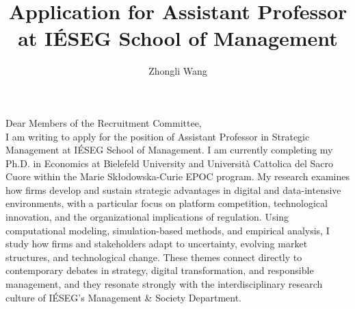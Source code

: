 \documentclass{nfr}
\title{Application for Assistant Professor at IÉSEG School of Management}
\author{Zhongli Wang}
\begin{document}

% 
% 
% 
% 


\maketitle


\noindent Dear Members of the Recruitment Committee,\\[0.2cm]

I am writing to apply for the position of Assistant Professor in Strategic Management at IÉSEG School of Management. 
I am currently completing my Ph.D. in Economics at Bielefeld University and Università Cattolica del Sacro Cuore within the Marie Skłodowska-Curie EPOC program. 
My research examines how firms develop and sustain strategic advantages in digital and data-intensive environments, with a particular focus on platform competition, technological innovation, and the organizational implications of regulation. 
Using computational modeling, simulation-based methods, and empirical analysis, I study how firms and stakeholders adapt to uncertainty, evolving market structures, and technological change. 
These themes connect directly to contemporary debates in strategy, digital transformation, and responsible management, and they resonate strongly with the interdisciplinary research culture of IÉSEG’s Management \& Society Department.\\
\end{document}
